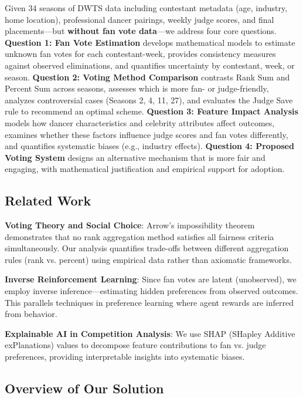 \documentclass{mcmthesis}
\begin{document}
Given 34 seasons of DWTS data including contestant metadata (age, industry, home location), professional dancer pairings, weekly judge scores, and final placements---but \textbf{without fan vote data}---we address four core questions. \textbf{Question 1: Fan Vote Estimation} develops mathematical models to estimate unknown fan votes for each contestant-week, provides consistency measures against observed eliminations, and quantifies uncertainty by contestant, week, or season. \textbf{Question 2: Voting Method Comparison} contrasts Rank Sum and Percent Sum across seasons, assesses which is more fan- or judge-friendly, analyzes controversial cases (Seasons 2, 4, 11, 27), and evaluates the Judge Save rule to recommend an optimal scheme. \textbf{Question 3: Feature Impact Analysis} models how dancer characteristics and celebrity attributes affect outcomes, examines whether these factors influence judge scores and fan votes differently, and quantifies systematic biases (e.g., industry effects). \textbf{Question 4: Proposed Voting System} designs an alternative mechanism that is more fair and engaging, with mathematical justification and empirical support for adoption.

\subsection{Related Work}

\textbf{Voting Theory and Social Choice}: Arrow's impossibility theorem demonstrates that no rank aggregation method satisfies all fairness criteria simultaneously. Our analysis quantifies trade-offs between different aggregation rules (rank vs. percent) using empirical data rather than axiomatic frameworks.

\textbf{Inverse Reinforcement Learning}: Since fan votes are latent (unobserved), we employ inverse inference---estimating hidden preferences from observed outcomes. This parallels techniques in preference learning where agent rewards are inferred from behavior.

\textbf{Explainable AI in Competition Analysis}: We use SHAP (SHapley Additive exPlanations) values to decompose feature contributions to fan vs. judge preferences, providing interpretable insights into systematic biases.

\subsection{Overview of Our Solution}
\end{document}
